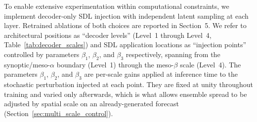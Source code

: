 \documentclass{agujournal2019}
\begin{document}

To enable extensive experimentation within computational constraints, we implement decoder-only SDL injection with independent latent sampling at each layer. Retrained ablations of both choices are reported in Section~5. We refer to architectural positions as ``decoder levels'' (Level~1 through Level~4, Table~\ref{tab:decoder_scales}) and SDL application locations as ``injection points'' controlled by parameters $\beta_1$, $\beta_2$, and $\beta_3$ respectively, spanning from the synoptic/meso-$\alpha$ boundary (Level~1) through the meso-$\beta$ scale (Level~4). The parameters $\beta_1$, $\beta_2$, and $\beta_3$ are per-scale gains applied at inference time to the stochastic perturbation injected at each point. They are fixed at unity throughout training and varied only afterwards, which is what allows ensemble spread to be adjusted by spatial scale on an already-generated forecast (Section~\ref{sec:multi_scale_control}).
\end{document}
